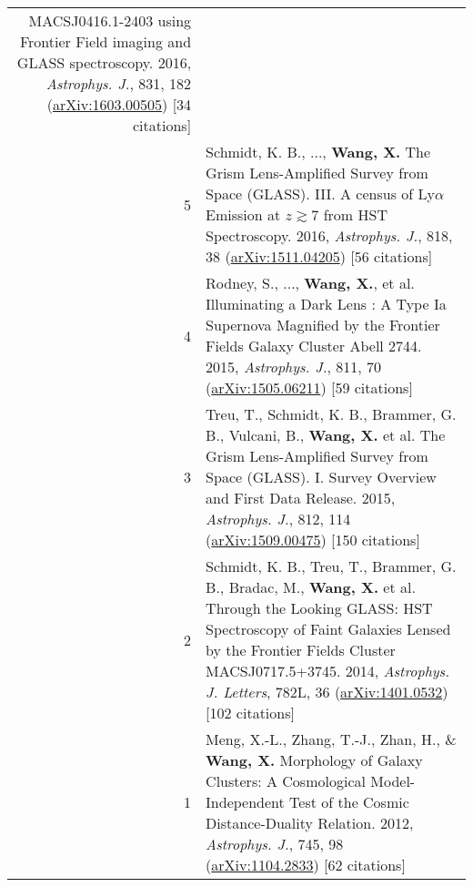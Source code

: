 \documentclass[letterpaper,10pt]{article}
\begin{document}
\begin{longtable}{rp{6.3in}}
    MACSJ0416.1-2403 using Frontier Field imaging and GLASS spectroscopy. 2016, \textit{Astrophys. J.}, 831, 182 (\href{https://arxiv.org/abs/1603.00505}
    {arXiv:1603.00505}) [34 citations]   \\
5   &   Schmidt, K. B., ..., \textbf{Wang, X.} The Grism Lens-Amplified Survey from Space (GLASS). III. A census of Ly$\alpha$ Emission at $z\gtrsim$7 
    from HST Spectroscopy. 2016, \textit{Astrophys. J.}, 818, 38 (\href{https://arxiv.org/abs/1511.04205}{arXiv:1511.04205}) [56 citations] \\
4   &   Rodney, S., ..., \textbf{Wang, X.}, et al. Illuminating a Dark Lens : A Type Ia Supernova Magnified by the Frontier Fields Galaxy Cluster 
    Abell 2744. 2015, \textit{Astrophys. J.}, 811, 70 (\href{https://arxiv.org/abs/1505.06211}{arXiv:1505.06211}) [59 citations]  \\
3   &   Treu, T., Schmidt, K. B., Brammer, G. B., Vulcani, B., \textbf{Wang, X.} et al. The Grism Lens-Amplified Survey from Space (GLASS). I. Survey 
    Overview and First Data Release. 2015, \textit{Astrophys. J.}, 812, 114 
    (\href{https://arxiv.org/abs/1509.00475}{arXiv:1509.00475}) [150 citations]  \\
2   &   Schmidt, K. B., Treu, T., Brammer, G. B., Bradac, M., \textbf{Wang, X.} et al. Through the Looking GLASS: HST Spectroscopy of Faint Galaxies 
    Lensed by the Frontier Fields Cluster MACSJ0717.5+3745. 2014, \textit{Astrophys. J. Letters}, 782L, 36 (\href{http://arxiv.org/abs/1401.0532}{arXiv:1401.0532}) [102 citations] \\
1   &   Meng, X.-L., Zhang, T.-J., Zhan, H., \& \textbf{Wang, X.} Morphology of Galaxy Clusters: A Cosmological Model-Independent Test of the Cosmic 
    Distance-Duality Relation. 2012, \textit{Astrophys. J.}, 745, 98 (\href{http://arxiv.org/abs/1104.2833}{arXiv:1104.2833}) [62 citations]

\end{longtable}
\endgroup
\end{document}
